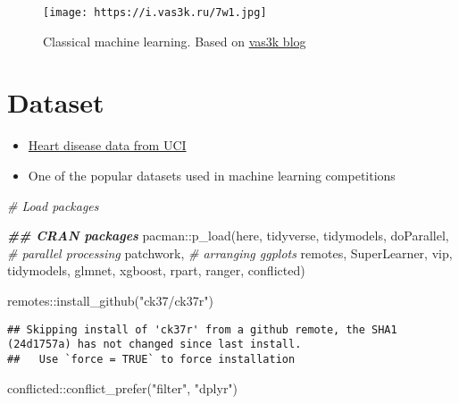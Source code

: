 \documentclass[
]{book}
\newenvironment{Shaded}{\begin{snugshade}}{\end{snugshade}}
\newcommand{\CommentTok}[1]{\textcolor[rgb]{0.56,0.35,0.01}{\textit{#1}}}
\newcommand{\DocumentationTok}[1]{\textcolor[rgb]{0.56,0.35,0.01}{\textbf{\textit{#1}}}}
\newcommand{\FunctionTok}[1]{\textcolor[rgb]{0.00,0.00,0.00}{#1}}
\newcommand{\NormalTok}[1]{#1}
\newcommand{\SpecialCharTok}[1]{\textcolor[rgb]{0.00,0.00,0.00}{#1}}
\newcommand{\StringTok}[1]{\textcolor[rgb]{0.31,0.60,0.02}{#1}}
\begin{document}
\begin{figure}
\centering
\texttt{[image: https://i.vas3k.ru/7w1.jpg]}
\caption{Classical machine learning. Based on \href{https://vas3k.com/blog/machine_learning/}{vas3k blog}}
\end{figure}

\hypertarget{dataset}{%
\section{Dataset}\label{dataset}}

\begin{itemize}
\item
  \href{https://archive.ics.uci.edu/ml/datasets/heart+Disease}{Heart disease data from UCI}
\item
  One of the popular datasets used in machine learning competitions
\end{itemize}

\begin{Shaded}
\begin{Highlighting}[]
\CommentTok{\# Load packages }

\DocumentationTok{\#\# CRAN packages }
\NormalTok{pacman}\SpecialCharTok{::}\FunctionTok{p\_load}\NormalTok{(here,}
\NormalTok{               tidyverse, }
\NormalTok{               tidymodels,}
\NormalTok{               doParallel, }\CommentTok{\# parallel processing }
\NormalTok{               patchwork, }\CommentTok{\# arranging ggplots}
\NormalTok{               remotes, }
\NormalTok{               SuperLearner, }
\NormalTok{               vip, }
\NormalTok{               tidymodels,}
\NormalTok{               glmnet,}
\NormalTok{               xgboost, }
\NormalTok{               rpart, }
\NormalTok{               ranger, }
\NormalTok{               conflicted)}

\NormalTok{remotes}\SpecialCharTok{::}\FunctionTok{install\_github}\NormalTok{(}\StringTok{"ck37/ck37r"}\NormalTok{)}
\end{Highlighting}
\end{Shaded}

\begin{verbatim}
## Skipping install of 'ck37r' from a github remote, the SHA1 (24d1757a) has not changed since last install.
##   Use `force = TRUE` to force installation
\end{verbatim}

\begin{Shaded}
\begin{Highlighting}[]
\NormalTok{conflicted}\SpecialCharTok{::}\FunctionTok{conflict\_prefer}\NormalTok{(}\StringTok{"filter"}\NormalTok{, }\StringTok{"dplyr"}\NormalTok{)}
\end{Highlighting}
\end{Shaded}
\end{document}
